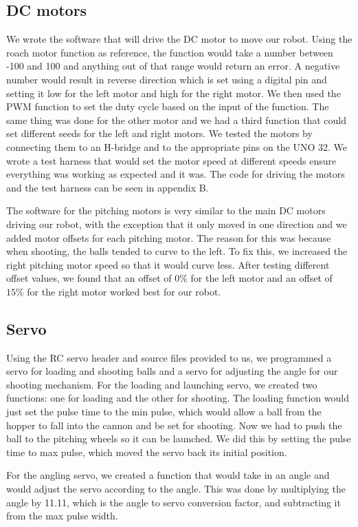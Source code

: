 \documentclass{article}
\begin{document}
\subsection{DC motors}
We wrote the software that will drive the DC motor to move our robot.  Using the roach motor function as reference, the function would take a number between -100 and 100 and anything out of that range would return an error.  A negative number would result in reverse direction which is set using a digital pin and setting it low for the left motor and high for the right motor.  We then used the PWM function to set the duty cycle based on the input of the function.  The same thing was done for the other motor and we had a third function that could set different seeds for the left and right motors.  We tested the motors by connecting them to an H-bridge and to the appropriate pins on the UNO 32.  We wrote a test harness that would set the motor speed at different speeds ensure everything was working as expected and it was.  The code for driving the motors and the test harness can be seen in appendix B.

The software for the pitching motors is very similar to the main DC motors driving our robot, with the exception that it only moved in one direction and we added motor offsets for each pitching motor.  The reason for this was because when shooting, the balls tended to curve to the left.  To fix this, we increased the right pitching motor speed so that it would curve less.  After testing different offset values, we found that an offset of $0\%$ for the left motor and an offset of $15\%$ for the right motor worked best for our robot.

\subsection{Servo}
Using the RC servo header and source files provided to us, we programmed a servo for loading and shooting balls and a servo for adjusting the angle for our shooting mechanism.  For the loading and launching servo, we created two functions: one for loading and the other for shooting.  The loading function would just set the pulse time to the min pulse, which would allow a ball from the hopper to fall into the cannon and be set for shooting.  Now we had to push the ball to the pitching wheels so it can be launched.  We did this by setting the pulse time to max pulse, which  moved the servo back its initial position.

For the angling servo, we created a function that would take in an angle and would adjust the servo according to the angle.  This was done by multiplying the angle by 11.11, which is the angle to servo conversion factor, and subtracting it from the max pulse width.
\end{document}
